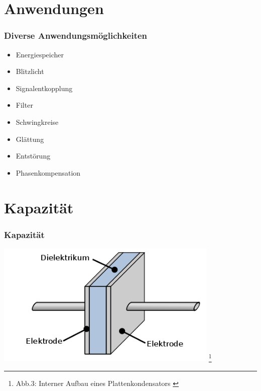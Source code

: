 \section*{Anwendungen}
\begin{frame}
  \frametitle{Diverse Anwendungsmöglichkeiten}
  \pause
  \begin{itemize}
    \item Energiespeicher
    \item Blitzlicht 
    \item Signalentkopplung
    \item Filter 
    \item Schwingkreise 
    \item Glättung 
    \item Entstörung 
    \item Phasenkompensation 
  \end{itemize}
\end{frame}


\section*{Kapazität}

\begin{frame}
    \frametitle{Kapazität}
	
	\begin{center}
        \includegraphics[width=0.8\textwidth]{e05/c-aufbau.png}
        \footnote{Abb.3: Interner Aufbau eines Plattenkondensators \cite{wp}}
    \end{center}
\end{frame}


